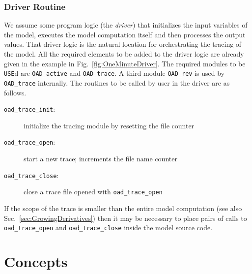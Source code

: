 \documentclass{article}
\newcommand{\refsec}[1]{{Sec.~\ref{#1}}}
\newcommand{\reffig}[1]{{Fig.~\ref{#1}}}
\begin{document}
\subsubsection{Driver Routine}\label{sec:DriverRoutine}

We assume some program logic (the {\em driver}) that initializes the input variables of the model, executes the model 
computation itself and then processes the output values. 
That driver logic  is the natural location for orchestrating the tracing of the model. 
All the required elements to be added to the driver logic are already given in the example 
in \reffig{fig:OneMinuteDriver}. The required modules to be \lstinline{USE}d 
are \lstinline{OAD_active} and 
\lstinline{OAD_trace}. A third module \lstinline{OAD_rev} is used by \lstinline{OAD_trace}
internally. The routines to be called by user in the driver are as follows.
\begin{description}
\item[{\tt oad\_trace\_init}:] initialize the tracing module by resetting the file counter
\item[{\tt oad\_trace\_open}:] start a new trace; increments the file name counter 
\item[{\tt oad\_trace\_close}:] close a trace file opened with \lstinline{oad_trace_open}
\end{description}   
If the scope of the trace is smaller than the entire model computation (see also \refsec{sec:GrowingDerivatives})
then it may be necessary to place pairs of calls to \lstinline{oad_trace_open} and \lstinline{oad_trace_close} inside the model 
source code. 

\section{Concepts}
\end{document}
